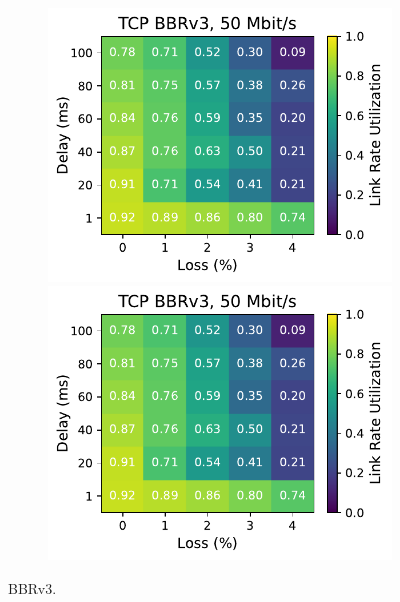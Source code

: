 \begin{figure}[ht]
\begin{subfigure}[b]{0.89cm}
        \includegraphics[width=\linewidth,trim={8cm 0 0 0},clip]{splitting-paper/figures/heatmaps/heatmap_tcp_bbr3_50mbps.pdf}
        \includegraphics[width=\linewidth,trim={8cm 0 0 0},clip]{splitting-paper/figures/heatmaps/heatmap_tcp_bbr3_50mbps.pdf}
        \vspace*{0.2cm}
    \end{subfigure}
    \caption{BBRv3.}
\end{figure}

